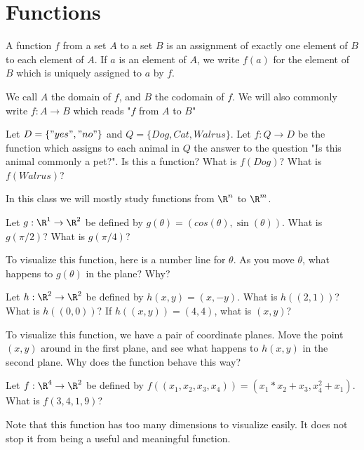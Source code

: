 
\section{Functions}

\begin{definition}
A function $f$ from a set $A$ to a set $B$ is an assignment of exactly one element of $B$ to each element of $A$.  If $a$ is an element of $A$, we write $f(a)$ for the element of 
$B$ which is uniquely assigned to $a$ by $f$. 
\end{definition}

We call $A$ the domain of $f$, and $B$ the codomain of $f$.  We will also commonly write $f:A \to B$ which reads "$f$ from $A$ to $B$"

\begin{question}
Let  $D =\{ "yes","no"\}$ and $Q = \{ Dog, Cat, Walrus\}$.  Let $f:Q \to D$ be the function which assigns to each animal in $Q$ the answer to the question "Is this animal commonly a pet?".
Is this a function?
What is $f(Dog)$?
What is $f(Walrus)$?
\end{question}

In this class we will mostly study functions  from $\R^n$ to $\R^m$.

\begin{question}
	Let $g:\R^1 \to \R^2$ be defined by $g(\theta) = (cos(\theta),\sin(\theta))$.
What is $g(\pi/2)$?
What is $g(\pi/4)$?

To visualize this function, here is a number line for $\theta$.  As you move $\theta$, what happens to $g(\theta)$ in the plane?  Why?
\end{question}

\begin{question}
Let $h:\R^2 \to \R^2$ be defined by $h(x,y) = (x,-y)$.
What is $h((2,1))$?
What is $h((0,0))$?
If $h((x,y)) = (4,4)$, what is $(x,y)$?

To visualize this function, we have a pair of coordinate planes.  Move the point $(x,y)$ around in the first plane, and see what happens to $h(x,y)$
in the second plane.  Why does the function behave this way?
\end{question}

\begin{question}
Let $f:\R^4 \to \R^2$ be defined by $f((x_1,x_2,x_3,x_4)) = (x_1*x_2+x_3,x_4^2+x_1)$.
What is $f(3,4,1,9)$?

Note that this function has too many dimensions to visualize easily.  It does not stop it from being a useful and meaningful function.
\end{question}

